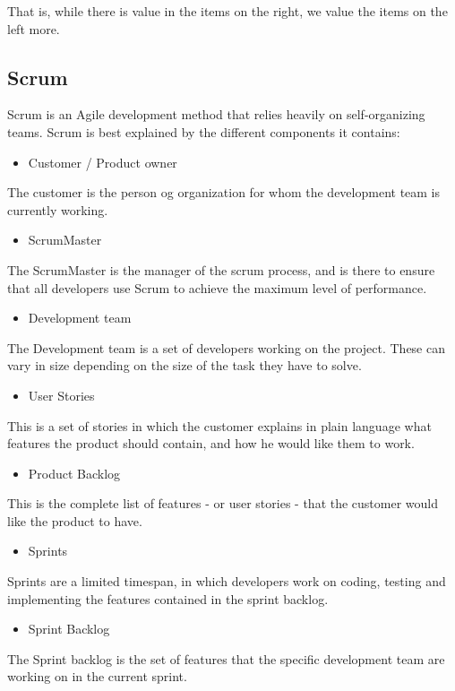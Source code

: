 That is, while there is value in the items on the right, we value the items on the left more.

\subsection{Scrum}
Scrum is an Agile development method that relies heavily on self-organizing teams. Scrum is best explained by the different components it contains:


\begin{itemize}
	\item Customer / Product owner
\end{itemize}
The customer is the person og organization for whom the development team is currently working.

\begin{itemize}
	\item ScrumMaster
\end{itemize}
The ScrumMaster is the manager of the scrum process, and is there to ensure that all developers use Scrum to achieve the maximum level of performance.

\begin{itemize}
	\item Development team
\end{itemize}
The Development team is a set of developers working on the project. These can vary in size depending on the size of the task they have to solve.

\begin{itemize}
	\item User Stories
\end{itemize}
This is a set of stories in which the customer explains in plain language what features the product should contain, and how he would like them to work.

\begin{itemize}
	\item Product Backlog
\end{itemize}
This is the complete list of features - or user stories - that the customer would like the product to have.

\begin{itemize}
	\item Sprints
\end{itemize}
Sprints are a limited timespan, in which developers work on coding, testing and implementing the features contained in the sprint backlog.

\begin{itemize}
	\item Sprint Backlog
\end{itemize}
The Sprint backlog is the set of features that the specific development team are working on in the current sprint.

